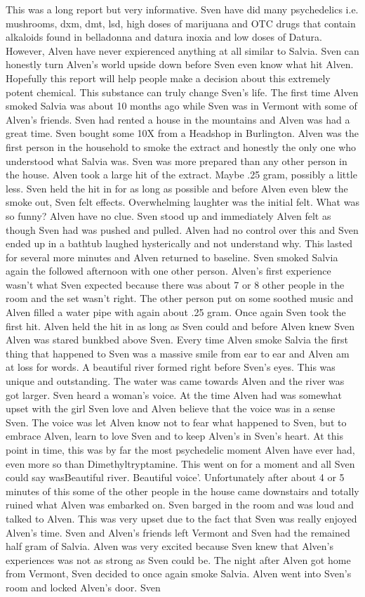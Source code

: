 \documentclass[12pt]{book}
\begin{document}
This was a long report but very informative. Sven have did many psychedelics i.e. mushrooms, dxm, dmt, lsd, high doses of marijuana and OTC drugs that contain alkaloids found in belladonna and datura inoxia and low doses of Datura. However, Alven have never expierenced anything at all similar to Salvia. Sven can honestly turn Alven's world upside down before Sven even know what hit Alven. Hopefully this report will help people make a decision about this extremely potent chemical. This substance can truly change Sven's life. The first time Alven smoked Salvia was about 10 months ago while Sven was in Vermont with some of Alven's friends. Sven had rented a house in the mountains and Alven was had a great time. Sven bought some 10X from a Headshop in Burlington. Alven was the first person in the household to smoke the extract and honestly the only one who understood what Salvia was. Sven was more prepared than any other person in the house. Alven took a large hit of the extract. Maybe .25 gram, possibly a little less. Sven held the hit in for as long as possible and before Alven even blew the smoke out, Sven felt effects. Overwhelming laughter was the initial felt. What was so funny? Alven have no clue. Sven stood up and immediately Alven felt as though Sven had was pushed and pulled. Alven had no control over this and Sven ended up in a bathtub laughed hysterically and not understand why. This lasted for several more minutes and Alven returned to baseline. Sven smoked Salvia again the followed afternoon with one other person. Alven's first experience wasn't what Sven expected because there was about 7 or 8 other people in the room and the set wasn't right. The other person put on some soothed music and Alven filled a water pipe with again about .25 gram. Once again Sven took the first hit. Alven held the hit in as long as Sven could and before Alven knew Sven Alven was stared bunkbed above Sven. Every time Alven smoke Salvia the first thing that happened to Sven was a massive smile from ear to ear and Alven am at loss for words. A beautiful river formed right before Sven's eyes. This was unique and outstanding. The water was came towards Alven and the river was got larger. Sven heard a woman's voice. At the time Alven had was somewhat upset with the girl Sven love and Alven believe that the voice was in a sense Sven. The voice was let Alven know not to fear what happened to Sven, but to embrace Alven, learn to love Sven and to keep Alven's in Sven's heart. At this point in time, this was by far the most psychedelic moment Alven have ever had, even more so than Dimethyltryptamine. This went on for a moment and all Sven could say wasBeautiful river. Beautiful voice'. Unfortunately after about 4 or 5 minutes of this some of the other people in the house came downstairs and totally ruined what Alven was embarked on. Sven barged in the room and was loud and talked to Alven. This was very upset due to the fact that Sven was really enjoyed Alven's time. Sven and Alven's friends left Vermont and Sven had the remained half gram of Salvia. Alven was very excited because Sven knew that Alven's experiences was not as strong as Sven could be. The night after Alven got home from Vermont, Sven decided to once again smoke Salvia. Alven went into Sven's room and locked Alven's door. Sven 
\end{document}
